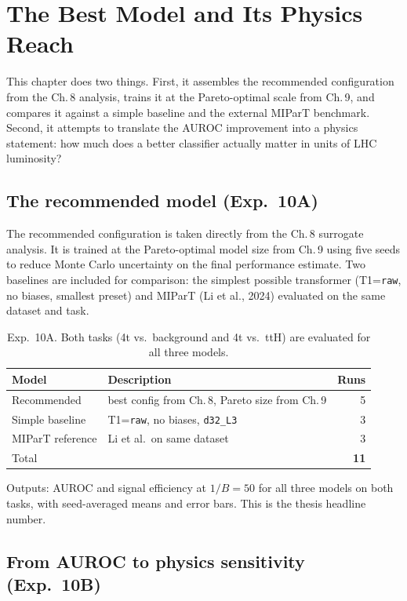 \chapter{The Best Model and Its Physics Reach}

This chapter does two things. First, it assembles the recommended
configuration from the Ch.\,8 analysis, trains it at the Pareto-optimal
scale from Ch.\,9, and compares it against a simple baseline and the
external MIParT benchmark. Second, it attempts to translate the AUROC
improvement into a physics statement: how much does a better classifier
actually matter in units of LHC luminosity?

\section{The recommended model (Exp.\ 10A)}

The recommended configuration is taken directly from the Ch.\,8
surrogate analysis. It is trained at the Pareto-optimal model size
from Ch.\,9 using five seeds to reduce Monte Carlo uncertainty on the
final performance estimate. Two baselines are included for comparison:
the simplest possible transformer (T1=\texttt{raw}, no biases, smallest
preset) and MIParT (Li et al., 2024) evaluated on the same dataset and
task.

\begin{table}[h]
\centering\small
\begin{tabular}{llr}
\toprule
Model & Description & Runs \\
\midrule
Recommended & best config from Ch.\,8, Pareto size from Ch.\,9 & 5 \\
Simple baseline & T1=\texttt{raw}, no biases, \texttt{d32\_L3} & 3 \\
MIParT reference & Li et al.\ on same dataset & 3 \\
\midrule
Total & & \textbf{11} \\
\bottomrule
\end{tabular}
\caption{Exp.\ 10A. Both tasks (4t vs.\ background and 4t vs.\ ttH)
are evaluated for all three models.}
\end{table}

Outputs: AUROC and signal efficiency at $1/B = 50$ for all three
models on both tasks, with seed-averaged means and error bars. This
is the thesis headline number.

\section{From AUROC to physics sensitivity (Exp.\ 10B)}


